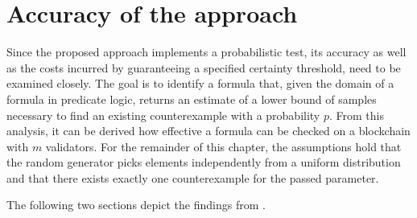 \section{Accuracy of the approach}\label{sec:accuracy}
Since the proposed approach implements a probabilistic test, its accuracy as well as the costs incurred by guaranteeing a specified certainty threshold, need to be examined closely. The goal is to identify a formula that, given the domain of a formula in predicate logic, returns an estimate of a lower bound of samples necessary to find an existing counterexample with a probability $p$. From this analysis, it can be derived how effective a formula can be checked on a blockchain with $m$ validators. For the remainder of this chapter, the assumptions hold that the random generator picks elements independently from a uniform distribution and that there exists exactly one counterexample for the passed parameter. 


The following two sections depict the findings from \cite{bernhardt_veigel_2020}.

